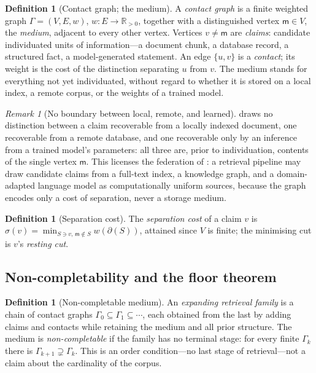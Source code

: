\documentclass[11pt,twocolumn,a4paper]{article}
\theoremstyle{frathm}
\theoremstyle{definition}
\newtheorem{definition}[theorem]{Definition}
\theoremstyle{remark}
\newtheorem{remark}[theorem]{Remark}
\newcommand{\R}{\mathbb{R}}
\newcommand{\Gph}{\Gamma}
\newcommand{\V}{V}
\newcommand{\E}{E}
\newcommand{\wt}{w}
\newcommand{\med}{\mathsf{m}}
\newcommand{\cut}{\partial}
\newcommand{\str}{\sigma}
\begin{document}
\begin{definition}[Contact graph; the medium]
\label{def:contact}
A \emph{contact graph} is a finite weighted graph $\Gph=(\V,\E,\wt)$,
$\wt:\E\to\R_{>0}$, together with a distinguished vertex $\med\in\V$, the
\emph{medium}, adjacent to every other vertex. Vertices $v\neq\med$ are
\emph{claims}: candidate individuated units of information---a document
chunk, a database record, a structured fact, a model-generated
statement. An edge $\{u,v\}$ is a \emph{contact}; its weight is the cost
of the distinction separating $u$ from $v$. The medium stands for
everything not yet individuated, without regard to whether it is stored
on a local index, a remote corpus, or the weights of a trained model.
\end{definition}

\begin{remark}[No boundary between local, remote, and learned]
\label{rem:no-boundary}
 draws no distinction between a claim recoverable from
a locally indexed document, one recoverable from a remote database, and
one recoverable only by an inference from a trained model's parameters:
all three are, prior to individuation, contents of the single vertex
$\med$. This licenses the federation of : a
retrieval pipeline may draw candidate claims from a full-text index, a
knowledge graph, and a domain-adapted language model as computationally
uniform sources, because the graph encodes only a cost of separation, never
a storage medium.
\end{remark}

\begin{definition}[Separation cost]
\label{def:sepcost}
The \emph{separation cost} of a claim $v$ is
$\str(v)=\min_{S\ni v,\,\med\notin S}\wt(\cut(S))$, attained since $\V$ is
finite; the minimising cut is $v$'s \emph{resting cut}.
\end{definition}

\subsection{Non-completability and the floor theorem}

\begin{definition}[Non-completable medium]
\label{def:noncompletable}
An \emph{expanding retrieval family} is a chain of contact graphs
$\Gph_0\subseteq\Gph_1\subseteq\cdots$, each obtained from the last by
adding claims and contacts while retaining the medium and all prior
structure. The medium is \emph{non-completable} if the family has no
terminal stage: for every finite $\Gph_k$ there is $\Gph_{k+1}
\supsetneq\Gph_k$. This is an order condition---no last stage of
retrieval---not a claim about the cardinality of the corpus.
\end{definition}
\end{document}
